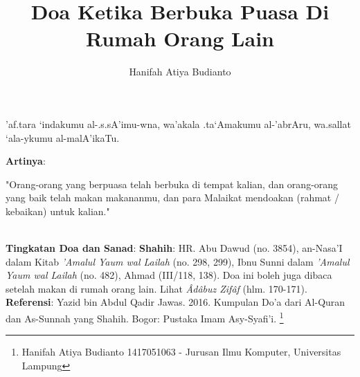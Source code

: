\documentclass[a4paper,12pt]{article}
\title{\Large Doa Ketika Berbuka Puasa Di Rumah Orang Lain}
\author{\calligra Hanifah Atiya Budianto}
\begin{document}
\sffamily
\maketitle 
\fullvocalize
{}
\begin{arabtext}
\noindent
'af.tara `indakumu al-.s.sA'imu-wna, wa'akala .ta`Amakumu al-'abrAru, 
wa.sallat `ala-ykumu al-malA'ikaTu.\\
\end{arabtext}
\noindent
\textbf{Artinya}:
\par
\indent
"Orang-orang yang berpuasa telah berbuka di tempat kalian, dan orang-orang 
yang baik telah makan makananmu, dan para Malaikat mendoakan (rahmat / 
kebaikan) untuk kalian."\\\\
\par
\noindent
\textbf{Tingkatan Doa dan Sanad}: \textbf{Shahih}: HR. Abu Dawud (no. 
3854), an-Nasa'I dalam Kitab \textit{'Amalul Yaum wal Lailah} (no. 298, 
299), Ibnu Sunni dalam \textit{'Amalul Yaum wal Lailah} (no. 482), Ahmad 
(III/118, 138). Doa ini boleh juga dibaca setelah makan di rumah orang 
lain. Lihat \textit{\^{A}d\^{a}buz Zif\^{a}f} (hlm. 170-171).\\
\textbf{Referensi}: Yazid bin Abdul Qadir Jawas. 2016. Kumpulan Do'a dari
Al-Quran dan As-Sunnah yang Shahih. Bogor: Pustaka Imam Asy-Syafi'i.
\footnote{Hanifah Atiya Budianto 1417051063 - Jurusan Ilmu Komputer,
Universitas Lampung}
\end{document}
